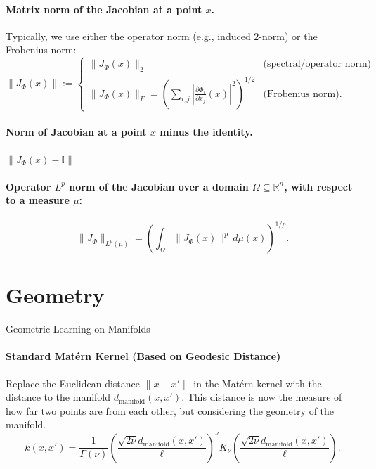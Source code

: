 \documentclass{article}
\theoremstyle{definition} \newtheorem{definition}{Definition}  \newtheorem{example}{Example}
\theoremstyle{remark} \newtheorem{remark}{Remark}
\newcounter{ct}
\begin{document}
\paragraph{Matrix norm of the Jacobian at a point \( x \).} Typically, we use either the operator norm (e.g., induced 2-norm) or the Frobenius norm:
\[
\|J_{\Phi}(x)\| :=
\begin{cases}
\|J_{\Phi}(x)\|_2 & \text{(spectral/operator norm)} \\
\|J_{\Phi}(x)\|_F = \left( \sum_{i,j} \left| \frac{\partial \Phi_i}{\partial x_j}(x) \right|^2 \right)^{1/2} & \text{(Frobenius norm)}.
\end{cases}
\]

\paragraph{Norm of Jacobian at a point \( x \) minus the identity.}
\(\|J_{\Phi}(x) - \mathbb{I}\| \)

\paragraph{Operator \( L^p \) norm of the Jacobian over a domain \( \Omega \subseteq \mathbb{R}^n \), with respect to a measure \( \mu \):}
\[
\|J_{\Phi}\|_{L^p(\mu)} = \left( \int_{\Omega} \|J_{\Phi}(x)\|^p \, d\mu(x) \right)^{1/p}.
\]



\newpage
\section{Geometry}
Geometric Learning on Manifolds\citep{mostowsky2024geometrickernels}


\paragraph{Standard Matérn Kernel (Based on Geodesic Distance)}
Replace the Euclidean distance  $\| x - x' \|$  in the Matérn kernel with the distance to the manifold  $ d_{\text{manifold}}(x, x')$. 
This distance is now the measure of how far two points are from each other, but considering the geometry of the manifold.
\begin{equation}
k(x, x') = \frac{1}{\Gamma(\nu)} \left( \frac{\sqrt{2\nu} d_{\text{manifold}}(x, x')}{\ell} \right)^\nu K_\nu\left( \frac{\sqrt{2\nu} d_{\text{manifold}}(x, x')}{\ell} \right).
\end{equation}
\end{document}
